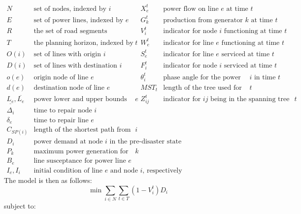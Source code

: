 \documentclass[10pt]{article}
\begin{document}
\small
\begin{displaymath}
\begin{array}{llll}
	 N & \mbox{set of nodes, indexed by $i$} & X_{e}^{t} & \mbox{power flow on line $e$ at time $t$}\\
	 E & \mbox{set of power lines, indexed by $e$} & G_{k}^t & \mbox{production from generator $k$ at time $t$}\\
	 R & \mbox{the set of road segments} & V_i^t & \mbox{indicator for node $i$ functioning at time $t$}\\
	 T & \mbox{the planning horizon, indexed by $t$} & W_{e}^t & \mbox{indicator for line $e$ functioning at time $t$} \\
	 O(i) & \mbox{set of lines with origin $i$} & S_{e}^t & \mbox{indicator for line $e$ serviced at time $t$}\\
	 D(i) & \mbox{set of lines with destination $i$} & F_i^t & \mbox{indicator for node $i$ serviced at time $t$}\\
	 o(e) & \mbox{origin node of line $e$} & \theta_i^t & \mbox{phase angle for the power flow at $i$ in time $t$}\\
	 d(e) & \mbox{destination node of line $e$} & MST_t & \mbox{length of the tree used for ``routing'' at $t$} \\
	 \underline{L_e},\overline{L_e} & \mbox{power lower and upper bounds for line $e$}& Z_{ij}^t & \mbox{indicator for $ij$ being in the spanning tree at $t$}\\
	 \Delta_{i} & \mbox{time to repair node $i$} \\
	 \delta_{e} & \mbox{time to repair line $e$}\\
	  C_{SP(i)} & \mbox{length of the shortest path from depot to node $i$}\\
	  D_i & \mbox{power demand at node $i$ in the pre-disaster state}\\
	  P_k & \mbox{maximum power generation for generator $k$}\\
	  B_e&  \mbox{line susceptance for power line $e$}\\
	 I_e, I_i & \mbox{initial condition of line $e$ and node $i$, respectively}
\end{array}
\end{displaymath}
\normalsize
The model is then as follows:
\begin{equation}
\min \sum_{i \in N} \sum_{t \in T} (1-V_i^t)D_i
\end{equation}
subject to:
\end{document}
